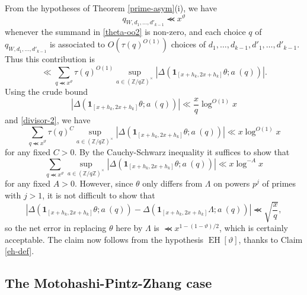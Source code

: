 \documentclass{bmcart}
\DeclareMathOperator*\EH{EH}
\theoremstyle{plain}
\theoremstyle{definition}
\newcommand\Z{\mathbb{Z}}
\renewcommand{\lessapprox}{\llcurly}
\newcommand{\onef}{\mathbf{1}}
\begin{document}
From the hypotheses of Theorem \ref{prime-asym}(i), we have
$$ q_{W,d_1,\dots,d'_{k-1}} \lessapprox x^\vartheta$$
whenever the summand in \eqref{theta-oo2} is non-zero, and each choice $q$ of $q_{W,d_1,\dots,d'_{k-1}}$ is associated to $O( \tau(q)^{O(1)} )$ choices of $d_1,\dots,d_{k-1},d'_1,\dots,d'_{k-1}$.  Thus this contribution is
$$
\ll \sum_{q \lessapprox x^\vartheta} \tau(q)^{O(1)} \sup_{a \in (\Z/q\Z)^\times} |\Delta( \onef_{[x+h_k,2x+h_k]} \theta; a\ (q) )|.$$
Using the crude bound
$$ |\Delta( \onef_{[x+h_k,2x+h_k]} \theta; a\ (q) )| \ll \frac{x}{q} \log^{O(1)} x$$
and \eqref{divisor-2}, we have
$$ \sum_{q \lessapprox x^\vartheta} \tau(q)^C \sup_{a \in (\Z/q\Z)^\times} |\Delta( \onef_{[x+h_k,2x+h_k]} \theta; a\ (q) )| \ll x \log^{O(1)} x$$
for any fixed $C>0$. By the Cauchy-Schwarz inequality it suffices to show that
$$ \sum_{q \lessapprox x^\vartheta} \sup_{a \in (\Z/q\Z)^\times} |\Delta( \onef_{[x+h_k,2x+h_k]} \theta; a\ (q) )| \ll x \log^{-A} x$$
for any fixed $A>0$.  However, since $\theta$ only differs from $\Lambda$ on powers $p^j$ of primes with $j>1$, it is not difficult to show that
$$  |\Delta( \onef_{[x+h_k,2x+h_k]} \theta; a\ (q) ) -  \Delta( \onef_{[x+h_k,2x+h_k]} \Lambda; a\ (q) )| \lessapprox \sqrt{\frac{x}{q}}, $$
so the net error in replacing $\theta$ here by $\Lambda$ is $\lessapprox x^{1 - (1-\vartheta)/2}$, which is certainly acceptable.  The claim now follows from the hypothesis $\EH[\vartheta]$, thanks to Claim \ref{eh-def}.


\subsection{The Motohashi-Pintz-Zhang case}
\end{document}
